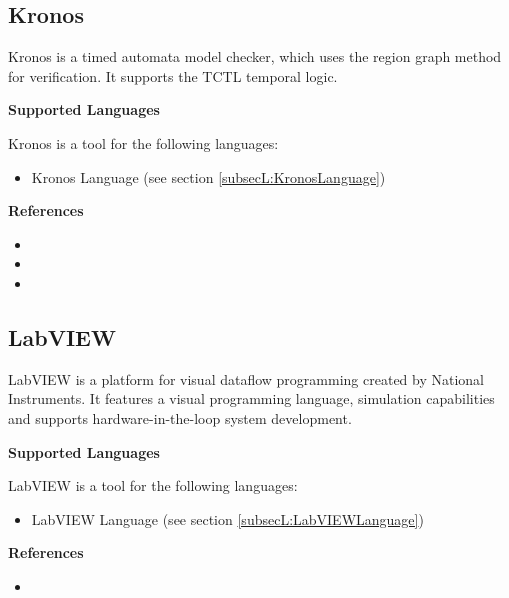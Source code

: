 \subsection{Kronos}
\label{subsecT:KronosTool}


Kronos is a timed automata model checker, which uses the region graph method for verification. It supports the TCTL temporal logic.

\textbf{Supported Languages}

Kronos is a tool for the following languages:
\begin{itemize}
	\item Kronos Language (see section \ref{subsecL:KronosLanguage})
\end{itemize}


\textbf{References}
\begin{itemize}
	
\item {}
	
\item {}
	
\item {}
\end{itemize}



\subsection{LabVIEW}
\label{subsecT:LabVIEW}


LabVIEW is a platform for visual dataflow programming created by National Instruments. It features a visual programming language, simulation capabilities and supports hardware-in-the-loop system development.

\textbf{Supported Languages}

LabVIEW is a tool for the following languages:
\begin{itemize}
	\item LabVIEW Language (see section \ref{subsecL:LabVIEWLanguage})
\end{itemize}


\textbf{References}
\begin{itemize}
	
\item {}
\end{itemize}



